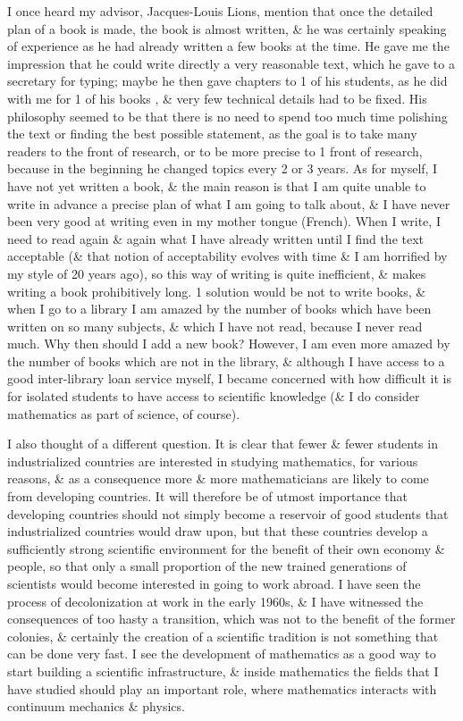 \documentclass{article}
\begin{document}
\begin{enumerate}
	I once heard my advisor, {\sc Jacques-Louis Lions}, mention that once the detailed plan of a book is made, the book is almost written, \& he was certainly speaking of experience as he had already written a few books at the time. He gave me the impression that he could write directly a very reasonable text, which he gave to a secretary for typing; maybe he then gave chapters to 1 of his students, as he did with me for 1 of his books \cite{Lions1969}, \& very few technical details had to be fixed. His philosophy seemed to be that there is no need to spend too much time polishing the text or finding the best possible statement, as the goal is to take many readers to the front of research, or to be more precise to 1 front of research, because in the beginning he changed topics every 2 or 3 years. As for myself, I have not yet written a book, \& the main reason is that I am quite unable to write in advance a precise plan of what I am going to talk about, \& I have never been very good at writing even in my mother tongue (French). When I write, I need to read again \& again what I have already written until I find the text acceptable (\& that notion of acceptability evolves with time \& I am horrified by my style of 20 years ago), so this way of writing is quite inefficient, \& makes writing a book prohibitively long. 1 solution would be not to write books, \& when I go to a library I am amazed by the number of books which have been written on so many subjects, \& which I have not read, because I never read much. Why then should I add a new book? However, I am even more amazed by the number of books which are not in the library, \& although I have access to a good inter-library loan service myself, I became concerned with how difficult it is for isolated students to have access to scientific knowledge (\& I do consider mathematics as part of science, of course).
	
	I also thought of a different question. It is clear that fewer \& fewer students in industrialized countries are interested in studying mathematics, for various reasons, \& as a consequence more \& more mathematicians are likely to come from developing countries. It will therefore be of utmost importance that developing countries should not simply become a reservoir of good students that industrialized countries would draw upon, but that these countries develop a sufficiently strong scientific environment for the benefit of their own economy \& people, so that only a small proportion of the new trained generations of scientists would become interested in going to work abroad. I have seen the process of decolonization at work in the early 1960s, \& I have witnessed the consequences of too hasty a transition, which was not to the benefit of the former colonies, \& certainly the creation of a scientific tradition is not something that can be done very fast. I see the development of mathematics as a good way to start building a scientific infrastructure, \& inside mathematics the fields that I have studied should play an important role, where mathematics interacts with continuum mechanics \& physics.
	

\end{enumerate}
\end{document}
